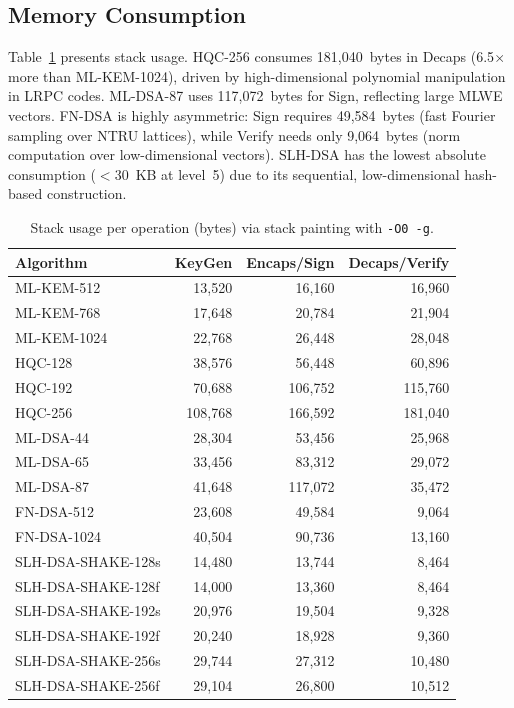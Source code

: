 \documentclass[12pt]{article}
\begin{document}
\subsection{Memory Consumption}
Table~\ref{tab:stack} presents stack usage. HQC-256 consumes 181,040~bytes
in Decaps (6.5$\times$ more than ML-KEM-1024), driven by high-dimensional
polynomial manipulation in LRPC codes. ML-DSA-87 uses 117,072~bytes for
Sign, reflecting large MLWE vectors. FN-DSA is highly asymmetric: Sign
requires 49,584~bytes (fast Fourier sampling over NTRU lattices), while
Verify needs only 9,064~bytes (norm computation over low-dimensional
vectors). SLH-DSA has the lowest absolute consumption ($<$30~KB at level~5)
due to its sequential, low-dimensional hash-based construction.

\begin{table}[htbp]
\centering
\caption{Stack usage per operation (bytes) via stack painting with \texttt{-O0 -g}.}
\label{tab:stack}
\small
\begin{tabular}{lrrr}
\hline
\textbf{Algorithm} & \textbf{KeyGen} & \textbf{Encaps/Sign} & \textbf{Decaps/Verify} \\
\hline
ML-KEM-512    &  13,520 &  16,160 &  16,960 \\
ML-KEM-768    &  17,648 &  20,784 &  21,904 \\
ML-KEM-1024   &  22,768 &  26,448 &  28,048 \\
HQC-128       &  38,576 &  56,448 &  60,896 \\
HQC-192       &  70,688 & 106,752 & 115,760 \\
HQC-256       & 108,768 & 166,592 & 181,040 \\
\hline
ML-DSA-44     &  28,304 &  53,456 &  25,968 \\
ML-DSA-65     &  33,456 &  83,312 &  29,072 \\
ML-DSA-87     &  41,648 & 117,072 &  35,472 \\
FN-DSA-512    &  23,608 &  49,584 &   9,064 \\
FN-DSA-1024   &  40,504 &  90,736 &  13,160 \\
SLH-DSA-SHAKE-128s &  14,480 &  13,744 &   8,464 \\
SLH-DSA-SHAKE-128f &  14,000 &  13,360 &   8,464 \\
SLH-DSA-SHAKE-192s &  20,976 &  19,504 &   9,328 \\
SLH-DSA-SHAKE-192f &  20,240 &  18,928 &   9,360 \\
SLH-DSA-SHAKE-256s &  29,744 &  27,312 &  10,480 \\
SLH-DSA-SHAKE-256f &  29,104 &  26,800 &  10,512 \\
\hline
\end{tabular}
\end{table}
\end{document}
